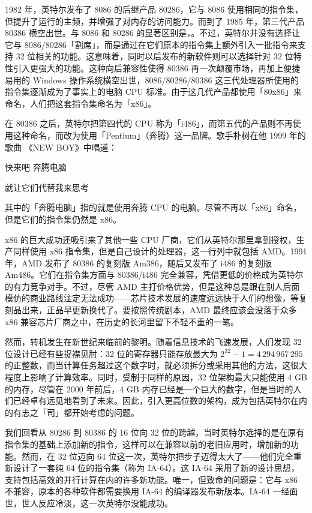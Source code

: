 1982 年，英特尔发布了 8086 的后继产品 80286，它与 8086 使用相同的指令集，但提升了运行的主频，并增强了对内存的访问能力。而到了 1985 年，第三代产品 80386 横空出世。与 8086 和 80286 的显著区别是，。不过，英特尔并没有选择让它与 8086/80286「割席」，而是通过在它们原本的指令集上额外引入一批指令来支持 32 位相关的功能。这意味着，同时以后发布的新软件则可以选择针对 32 位特性引入更强大的功能。这种向后兼容性使得 80386 再一次颠覆市场，再加上便捷易用的 Windows 操作系统横空出世，8086/80286/80386 这三代处理器所使用的指令集逐渐成为了事实上的电脑 CPU 标准。由于这几代产品都使用「80x86」来命名，人们把这套指令集命名为「x86」。

\begin{note}
  在 80386 之后，英特尔把第四代的 CPU 称为「i486」，而第五代的产品则不再使用这种命名，而改为使用「Pentium」（奔腾）这一品牌。歌手朴树在他 1999 年的歌曲 《NEW BOY》中唱道：
  \begin{quoting}
    \centering
    快来吧 奔腾电脑\par
    就让它们代替我来思考
  \end{quoting}

  其中的「奔腾电脑」指的就是使用奔腾 CPU 的电脑。尽管不再以「x86」命名，但是它们的指令集仍然是 x86。
\end{note}

x86 的巨大成功还吸引来了其他一些 CPU 厂商，它们从英特尔那里拿到授权，生产同样使用 x86 指令集，但是自己设计的处理器，这一行列中就包括 AMD。1991 年，AMD 发布了 80386 的复刻版 Am386，随后又发布了 i486 的复刻版 Am486。它们在指令集方面与 80386/i486 完全兼容，凭借更低的价格成为英特尔的有力竞争对手。不过，尽管 AMD 主打价格优势，但是这种总是跟在别人后面模仿的商业路线注定无法成功——芯片技术发展的速度远远快于人们的想像，等复刻品出来，正品早更新换代了。要按照传统剧本，AMD 最终应该会没落于众多 x86 兼容芯片厂商之中，在历史的长河里留下不轻不重的一笔。

然而，转机发生在新世纪来临前的黎明。随着信息技术的飞速发展，人们发现 32 位设计已经有些捉襟见肘：32 位的寄存器只能存放最大为 $2^{32}-1=4\,294\,967\,295$ 的正整数，而当计算任务超过这个数字时，就必须拆分或采用其他的方法，这很大程度上影响了计算效率。同时，受制于同样的原因，32 位架构最大只能使用 4 GB 的内存，尽管在 2000 年前后，4 GB 内存已经是一个巨大的数字，但是当时的人们已经卓有远见地看到了未来。因此，引入更高位数的架构，成为包括英特尔在内的有志之「司」都开始考虑的问题。

我们回看从 80286 到 80386 的 16 位向 32 位的跨越，当时英特尔选择的是在原有指令集的基础上添加新的指令，这样可以在兼容以前的老旧应用时，增加新的功能。然而，在 32 位迈向 64 位这一次，英特尔把步子迈得太大了——他们完全重新设计了一套纯 64 位的指令集（称为 IA-64）。这 IA-64 采用了新的设计思想，支持包括高效的并行计算在内的许多新功能。唯一，但致命的问题是：它与 x86 不兼容，原本的各种软件都需要换用 IA-64 的编译器发布新版本。IA-64 一经面世，世人反应冷淡，这一次英特尔没能成功。

